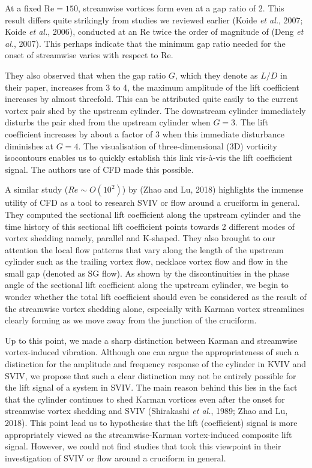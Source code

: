\documentclass[]{article}
\begin{document}
At a fixed \(\text{Re} = 150\), streamwise vortices form even at a gap
ratio of 2. This result differs quite strikingly from studies we
reviewed earlier (Koide \emph{et al.}, 2007; Koide \emph{et al.}, 2006),
conducted at an Re twice the order of magnitude of (Deng \emph{et al.},
2007). This perhaps indicate that the minimum gap ratio needed for the
onset of streamwise varies with respect to Re.

They also observed that when the gap ratio \(G\), which they denote as
\(L/D\) in their paper, increases from 3 to 4, the maximum amplitude of
the lift coefficient increases by almost threefold. This can be
attributed quite easily to the current vortex pair shed by the upstream
cylinder. The downstream cylinder immediately disturbs the pair shed
from the upstream cylinder when \(G = 3\). The lift coefficient
increases by about a factor of 3 when this immediate disturbance
diminishes at \(G = 4\). The visualisation of three-dimensional (3D)
vorticity isocontours enables us to quickly establish this link
vis-à-vis the lift coefficient signal. The authors use of CFD made this
possible.

A similar study (\(Re\sim O(10^{2})\)) by (Zhao and Lu, 2018) highlights
the immense utility of CFD as a tool to research SVIV or flow around a
cruciform in general. They computed the sectional lift coefficient along
the upstream cylinder and the time history of this sectional lift
coefficient points towards 2 different modes of vortex shedding namely,
parallel and K-shaped. They also brought to our attention the local flow
patterns that vary along the length of the upstream cylinder such as the
trailing vortex flow, necklace vortex flow and flow in the small gap
(denoted as SG flow). As shown by the discontinuities in the phase angle
of the sectional lift coefficient along the upstream cylinder, we begin
to wonder whether the total lift coefficient should even be considered
as the result of the streamwise vortex shedding alone, especially with
Karman vortex streamlines clearly forming as we move away from the
junction of the cruciform.

Up to this point, we made a sharp distinction between Karman and
streamwise vortex-induced vibration. Although one can argue the
appropriateness of such a distinction for the amplitude and frequency
response of the cylinder in KVIV and SVIV, we propose that such a clear
distinction may not be entirely possible for the lift signal of a system
in SVIV. The main reason behind this lies in the fact that the cylinder
continues to shed Karman vortices even after the onset for streamwise
vortex shedding and SVIV (Shirakashi \emph{et al.}, 1989; Zhao and Lu,
2018). This point lead us to hypothesise that the lift (coefficient)
signal is more appropriately viewed as the streamwise-Karman
vortex-induced composite lift signal. However, we could not find studies
that took this viewpoint in their investigation of SVIV or flow around a
cruciform in general.
\end{document}
